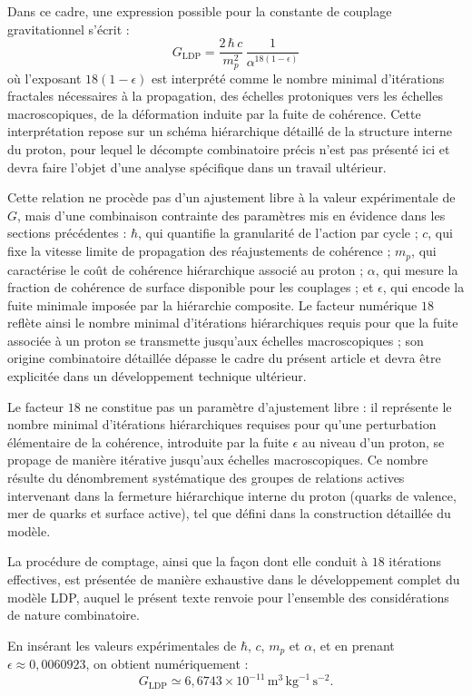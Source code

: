 \documentclass[11pt,a4paper]{article}
\begin{document}
Dans ce cadre, une expression possible pour la constante de couplage gravitationnel s’écrit :
\[
G_{\mathrm{LDP}} = \frac{2\,\hbar\, c}{m_p^2}\,\frac{1}{\alpha^{18\left(1-\epsilon\right)}}
\]
où l’exposant \(18\left(1-\epsilon\right)\) est interprété comme le nombre minimal d’itérations fractales nécessaires à la propagation, des échelles protoniques vers les échelles macroscopiques, de la déformation induite par la fuite de cohérence. Cette interprétation repose sur un schéma hiérarchique détaillé de la structure interne du proton, pour lequel le décompte combinatoire précis n’est pas présenté ici et devra faire l’objet d’une analyse spécifique dans un travail ultérieur.

Cette relation ne procède pas d’un ajustement libre à la valeur expérimentale de \(G\), mais d’une combinaison contrainte des paramètres mis en évidence dans les sections précédentes : \(\hbar\), qui quantifie la granularité de l’action par cycle ; \(c\), qui fixe la vitesse limite de propagation des réajustements de cohérence ; \(m_p\), qui caractérise le coût de cohérence hiérarchique associé au proton ; \(\alpha\), qui mesure la fraction de cohérence de surface disponible pour les couplages ; et \(\epsilon\), qui encode la fuite minimale imposée par la hiérarchie composite. Le facteur numérique \(18\) reflète ainsi le nombre minimal d’itérations hiérarchiques requis pour que la fuite associée à un proton se transmette jusqu’aux échelles macroscopiques ; son origine combinatoire détaillée dépasse le cadre du présent article et devra être explicitée dans un développement technique ultérieur.

Le facteur \(18\) ne constitue pas un paramètre d’ajustement libre : il représente le nombre minimal d’itérations hiérarchiques requises pour qu’une perturbation élémentaire de la cohérence, introduite par la fuite \(\epsilon\) au niveau d’un proton, se propage de manière itérative jusqu’aux échelles macroscopiques. Ce nombre résulte du dénombrement systématique des groupes de relations actives intervenant dans la fermeture hiérarchique interne du proton (quarks de valence, mer de quarks et surface active), tel que défini dans la construction détaillée du modèle.

La procédure de comptage, ainsi que la façon dont elle conduit à \(18\) itérations effectives, est présentée de manière exhaustive dans le développement complet du modèle LDP, auquel le présent texte renvoie pour l’ensemble des considérations de nature combinatoire.

En insérant les valeurs expérimentales de \(\hbar\), \(c\), \(m_p\) et \(\alpha\), et en prenant \(\epsilon \approx 0{,}0060923\), on obtient numériquement :
\[
G_{\mathrm{LDP}} \simeq 6{,}6743\times 10^{-11}\,\mathrm{m}^3\,\mathrm{kg}^{-1}\,\mathrm{s}^{-2}.
\]
\end{document}
